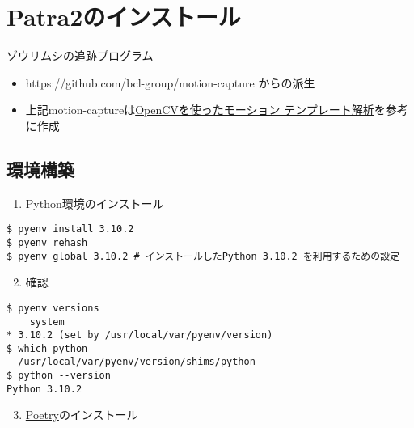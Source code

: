 \documentclass[]{jsarticle}
\providecommand{\tightlist}{%
   \setlength{\itemsep}{0pt}\setlength{\parskip}{0pt}}
\begin{document}
\noindent
  

\hypertarget{patra2ux306eux30a4ux30f3ux30b9ux30c8ux30fcux30eb}{%
\section{Patra2のインストール}\label{patra2ux306eux30a4ux30f3ux30b9ux30c8ux30fcux30eb}}

ゾウリムシの追跡プログラム

\begin{itemize}
\tightlist
\item
  https://github.com/bcl-group/motion-capture からの派生
\item
  上記motion-captureは\href{https://qiita.com/hitomatagi/items/a4ecf7babdbe710208ae}{OpenCVを使ったモーション
  テンプレート解析}を参考に作成
\end{itemize}

\hypertarget{ux74b0ux5883ux69cbux7bc9}{%
\subsection{環境構築}\label{ux74b0ux5883ux69cbux7bc9}}

\begin{enumerate}
\tightlist
\item
  Python環境のインストール
\end{enumerate}

\begin{lstlisting}
$ pyenv install 3.10.2
$ pyenv rehash
$ pyenv global 3.10.2 # インストールしたPython 3.10.2 を利用するための設定
\end{lstlisting}

\begin{enumerate}
\setcounter{enumi}{1}
\tightlist
\item
  確認
\end{enumerate}

\begin{lstlisting}
$ pyenv versions
    system
* 3.10.2 (set by /usr/local/var/pyenv/version)
$ which python
  /usr/local/var/pyenv/version/shims/python
$ python --version
Python 3.10.2
\end{lstlisting}

\begin{enumerate}
\setcounter{enumi}{2}
\tightlist
\item
  \href{https://python-poetry.org/docs/}{Poetry}のインストール
\end{enumerate}
\end{document}
